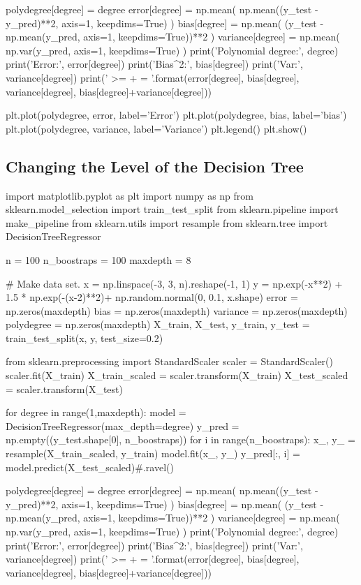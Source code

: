 \documentclass[%
oneside,                 %
final,                   %
10pt]{article}
\begin{document}
    polydegree[degree] = degree
    error[degree] = np.mean( np.mean((y_test - y_pred)**2, axis=1, keepdims=True) )
    bias[degree] = np.mean( (y_test - np.mean(y_pred, axis=1, keepdims=True))**2 )
    variance[degree] = np.mean( np.var(y_pred, axis=1, keepdims=True) )
    print('Polynomial degree:', degree)
    print('Error:', error[degree])
    print('Bias^2:', bias[degree])
    print('Var:', variance[degree])
    print('{} >= {} + {} = {}'.format(error[degree], bias[degree], variance[degree], bias[degree]+variance[degree]))

plt.plot(polydegree, error, label='Error')
plt.plot(polydegree, bias, label='bias')
plt.plot(polydegree, variance, label='Variance')
plt.legend()
plt.show()

\epycod


\subsection{Changing the Level of the Decision Tree}

\bpycod

import matplotlib.pyplot as plt
import numpy as np
from sklearn.model_selection import train_test_split
from sklearn.pipeline import make_pipeline
from sklearn.utils import resample
from sklearn.tree import DecisionTreeRegressor

n = 100
n_boostraps = 100
maxdepth = 8

# Make data set.
x = np.linspace(-3, 3, n).reshape(-1, 1)
y = np.exp(-x**2) + 1.5 * np.exp(-(x-2)**2)+ np.random.normal(0, 0.1, x.shape)
error = np.zeros(maxdepth)
bias = np.zeros(maxdepth)
variance = np.zeros(maxdepth)
polydegree = np.zeros(maxdepth)
X_train, X_test, y_train, y_test = train_test_split(x, y, test_size=0.2)

from sklearn.preprocessing import StandardScaler
scaler = StandardScaler()
scaler.fit(X_train)
X_train_scaled = scaler.transform(X_train)
X_test_scaled = scaler.transform(X_test)

for degree in range(1,maxdepth):
    model = DecisionTreeRegressor(max_depth=degree) 
    y_pred = np.empty((y_test.shape[0], n_boostraps))
    for i in range(n_boostraps):
        x_, y_ = resample(X_train_scaled, y_train)
        model.fit(x_, y_)
        y_pred[:, i] = model.predict(X_test_scaled)#.ravel()

    polydegree[degree] = degree
    error[degree] = np.mean( np.mean((y_test - y_pred)**2, axis=1, keepdims=True) )
    bias[degree] = np.mean( (y_test - np.mean(y_pred, axis=1, keepdims=True))**2 )
    variance[degree] = np.mean( np.var(y_pred, axis=1, keepdims=True) )
    print('Polynomial degree:', degree)
    print('Error:', error[degree])
    print('Bias^2:', bias[degree])
    print('Var:', variance[degree])
    print('{} >= {} + {} = {}'.format(error[degree], bias[degree], variance[degree], bias[degree]+variance[degree]))
\end{document}
